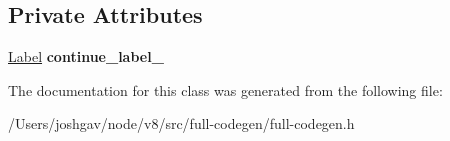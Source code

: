 \subsection*{Private Attributes}
\begin{DoxyCompactItemize}
\item 
\hyperlink{classv8_1_1internal_1_1_label}{Label} {\bfseries continue\+\_\+label\+\_\+}\hypertarget{classv8_1_1internal_1_1_full_code_generator_1_1_iteration_a2d2c08511d9e4fe311c72907e7d5203e}{}\label{classv8_1_1internal_1_1_full_code_generator_1_1_iteration_a2d2c08511d9e4fe311c72907e7d5203e}

\end{DoxyCompactItemize}


The documentation for this class was generated from the following file\+:\begin{DoxyCompactItemize}
\item 
/\+Users/joshgav/node/v8/src/full-\/codegen/full-\/codegen.\+h\end{DoxyCompactItemize}
